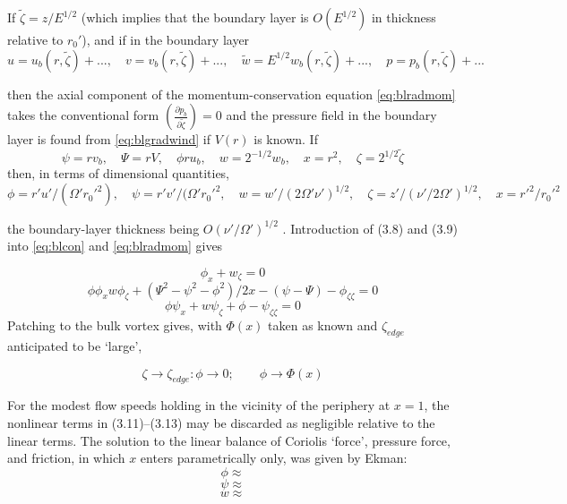 \documentclass[preprint, prX]{revtex4}
\newcommand{\ppd}[2]{\left(\frac{\partial#1}{\partial#2}\right)}
\begin{document}
If $\tilde{\zeta} = z/E^{1/2}$ (which implies that the boundary layer is $O(E^{1/2} )$ in thickness relative
to $r_0'$), and if in the boundary layer
\begin{equation}
u = u_b(r,\tilde{\zeta})+..., \quad 
v = v_b(r,\tilde{\zeta})+..., \quad 
\tilde{w} = E^{1/2}w_b(r,\tilde{\zeta})+..., \quad 
p = p_b(r,\tilde{\zeta})+... 
\end{equation}

then the axial component of the momentum-conservation equation \eqref{eq:blradmom} takes the
conventional form $\ppd{p_b}{\tilde{\zeta}}=0$ and the pressure field in the boundary layer is found from \eqref{eq:blgradwind} if $V(r)$ is known. If
\begin{equation}
\psi = r v_b, \quad
\Psi = rV, \quad
\phi r u_b, \quad
w=2^{-1/2} w_b, \quad
x=r^2, \quad
\zeta = 2^{1/2} \tilde{\zeta}
\end{equation}
then, in terms of dimensional quantities,
\begin{equation}
\phi = r'u'/(\Omega'r_0'^2), \quad
\psi = r'v'/(\Omega'r_0'^2, \quad
w=w'/(2\Omega'\nu')^{1/2}, \quad
\zeta= z'/(\nu'/2\Omega')^{1/2}, \quad
x = r'^2/r_0'^2
\end{equation}

the boundary-layer thickness being $O(\nu'/ \Omega')^{1/2}$ . Introduction of (3.8) and (3.9) into
\eqref{eq:blcon} and \eqref{eq:blradmom} gives

\begin{equation}
\phi_x + w_\zeta =0
\end{equation}
\begin{equation}
\phi \phi_x w \phi_\zeta + (\Psi^2 - \psi^2 - \phi^2)/2x -(\psi - \Psi) - \phi_{\zeta\zeta} = 0
\end{equation}
\begin{equation}
\phi \psi_x + w \psi_\zeta + \phi - \psi_{\zeta\zeta}=0
\end{equation}
Patching to the bulk vortex gives, with $\Phi(x)$ taken as known and $\zeta_{edge}$ anticipated to
be `large',

\begin{equation}
\zeta \rightarrow \zeta_{edge}: \phi \rightarrow 0; \qquad \phi \rightarrow \Phi(x)
\end{equation}

For the modest flow speeds holding in the vicinity of the periphery at $x = 1$, the nonlinear terms in (3.11)–(3.13) may be discarded as negligible relative to the linear terms. The solution to the linear balance of Coriolis `force', pressure force, and friction, in which $x$ enters parametrically only, was given by Ekman:
\begin{equation}
\phi \approx
\end{equation}
\begin{equation}
\psi \approx
\end{equation}
\begin{equation}
w \approx
\end{equation}
\end{document}
